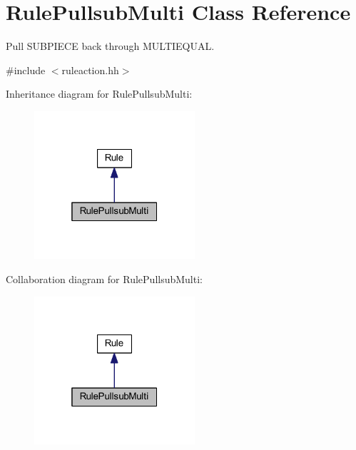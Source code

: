 \hypertarget{class_rule_pullsub_multi}{}\section{Rule\+Pullsub\+Multi Class Reference}
\label{class_rule_pullsub_multi}


Pull S\+U\+B\+P\+I\+E\+CE back through M\+U\+L\+T\+I\+E\+Q\+U\+AL.  




{\ttfamily \#include $<$ruleaction.\+hh$>$}



Inheritance diagram for Rule\+Pullsub\+Multi\+:
\nopagebreak
\begin{figure}[H]
\begin{center}
\leavevmode
\includegraphics[width=169pt]{class_rule_pullsub_multi__inherit__graph}
\end{center}
\end{figure}


Collaboration diagram for Rule\+Pullsub\+Multi\+:
\nopagebreak
\begin{figure}[H]
\begin{center}
\leavevmode
\includegraphics[width=169pt]{class_rule_pullsub_multi__coll__graph}
\end{center}
\end{figure}
